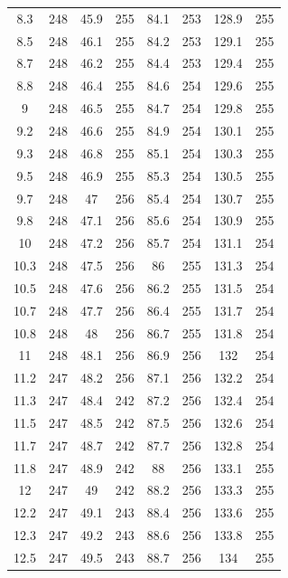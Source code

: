 \documentclass[12pt]{ctexart}
\numberwithin{equation}{section}
\begin{document}
\begin{longtable}{cc|cc|cc|cc}
8.3  &  248  &  45.9  &  255  &  84.1  &  253  &  128.9  &  255  \\
8.5  &  248  &  46.1  &  255  &  84.2  &  253  &  129.1  &  255  \\
8.7  &  248  &  46.2  &  255  &  84.4  &  253  &  129.4  &  255  \\
8.8  &  248  &  46.4  &  255  &  84.6  &  254  &  129.6  &  255  \\
9  &  248  &  46.5  &  255  &  84.7  &  254  &  129.8  &  255  \\
9.2  &  248  &  46.6  &  255  &  84.9  &  254  &  130.1  &  255  \\
9.3  &  248  &  46.8  &  255  &  85.1  &  254  &  130.3  &  255  \\
9.5  &  248  &  46.9  &  255  &  85.3  &  254  &  130.5  &  255  \\
9.7  &  248  &  47  &  256  &  85.4  &  254  &  130.7  &  255  \\
9.8  &  248  &  47.1  &  256  &  85.6  &  254  &  130.9  &  255  \\
10  &  248  &  47.2  &  256  &  85.7  &  254  &  131.1  &  254  \\
10.3  &  248  &  47.5  &  256  &  86  &  255  &  131.3  &  254  \\
10.5  &  248  &  47.6  &  256  &  86.2  &  255  &  131.5  &  254  \\
10.7  &  248  &  47.7  &  256  &  86.4  &  255  &  131.7  &  254  \\
10.8  &  248  &  48  &  256  &  86.7  &  255  &  131.8  &  254  \\
11  &  248  &  48.1  &  256  &  86.9  &  256  &  132  &  254  \\
11.2  &  247  &  48.2  &  256  &  87.1  &  256  &  132.2  &  254  \\
11.3  &  247  &  48.4  &  242  &  87.2  &  256  &  132.4  &  254  \\
11.5  &  247  &  48.5  &  242  &  87.5  &  256  &  132.6  &  254  \\
11.7  &  247  &  48.7  &  242  &  87.7  &  256  &  132.8  &  254  \\
11.8  &  247  &  48.9  &  242  &  88  &  256  &  133.1  &  255  \\
12  &  247  &  49  &  242  &  88.2  &  256  &  133.3  &  255  \\
12.2  &  247  &  49.1  &  243  &  88.4  &  256  &  133.6  &  255  \\
12.3  &  247  &  49.2  &  243  &  88.6  &  256  &  133.8  &  255  \\
12.5  &  247  &  49.5  &  243  &  88.7  &  256  &  134  &  255  \\

\end{longtable}
\end{document}
